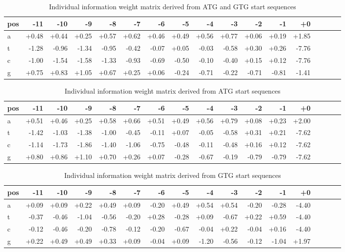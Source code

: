 \begin{table}
\begin{small}
\begin{tabular}{l|rrrrrrrrrrrrrrrr}
\hline
pos  &-11  &-10  & -9  & -8  & -7  & -6  & -5  & -4  & -3  & -2  & -1
& +0\\
\hline
 a &+0.48&+0.44&+0.25&+0.57&+0.62&+0.46&+0.49&+0.56&+0.77&+0.06&+0.19&+1.85\\
 t &-1.28&-0.96&-1.34&-0.95&-0.42&-0.07&+0.05&-0.03&-0.58&+0.30&+0.26&-7.76\\
 c &-1.00&-1.54&-1.58&-1.33&-0.93&-0.69&-0.50&-0.10&-0.40&+0.15&+0.12&-7.76\\
 g &+0.75&+0.83&+1.05&+0.67&+0.25&+0.06&-0.24&-0.71&-0.22&-0.71&-0.81&-1.41\\
\hline
\end{tabular}
\end{small}
\caption{Individual information weight matrix derived from ATG and
GTG start sequences} 
\label{magtg}
\end{table}
\begin{table}
\begin{small}
\begin{tabular}{l|rrrrrrrrrrrrrrrr}
\hline
pos  &-11  &-10  & -9  & -8  & -7  & -6  & -5  & -4  & -3  & -2  & -1
& +0\\
\hline
 a &+0.51&+0.46&+0.25&+0.58&+0.66&+0.51&+0.49&+0.56&+0.79&+0.08&+0.23&+2.00\\
 t &-1.42&-1.03&-1.38&-1.00&-0.45&-0.11&+0.07&-0.05&-0.58&+0.31&+0.21&-7.62\\
 c &-1.14&-1.73&-1.86&-1.40&-1.06&-0.75&-0.48&-0.11&-0.48&+0.16&+0.12&-7.62\\
 g &+0.80&+0.86&+1.10&+0.70&+0.26&+0.07&-0.28&-0.67&-0.19&-0.79&-0.79&-7.62\\
\hline
\end{tabular}
\end{small}
\caption{Individual information weight matrix derived from ATG start
sequences} 
\label{matg}
\end{table}
\begin{table}
\begin{small}
\begin{tabular}{l|rrrrrrrrrrrrrrrr}
\hline
pos  &-11  &-10  & -9  & -8  & -7  & -6  & -5  & -4  & -3  & -2  & -1
& +0\\
\hline
 a &+0.09&+0.09&+0.22&+0.49&+0.09&-0.20&+0.49&+0.54&+0.54&-0.20&-0.28&-4.40\\
 t &-0.37&-0.46&-1.04&-0.56&-0.20&+0.28&-0.28&+0.09&-0.67&+0.22&+0.59&-4.40\\
 c &-0.12&-0.46&-0.20&-0.78&-0.12&-0.20&-0.67&-0.04&+0.22&-0.04&+0.16&-4.40\\
 g &+0.22&+0.49&+0.49&+0.33&+0.09&-0.04&+0.09&-1.20&-0.56&-0.12&-1.04&+1.97\\
\hline
\end{tabular}
\end{small}
\caption{Individual information weight matrix derived from GTG start
sequences} 
\label{mgtg}
\end{table}


